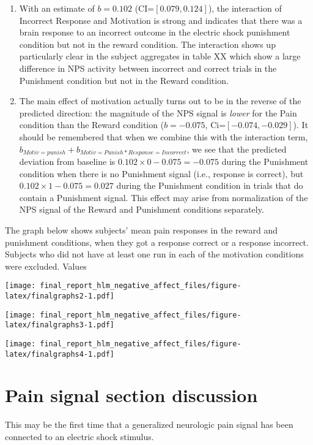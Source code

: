 \documentclass[]{article}
\providecommand{\tightlist}{%
  \setlength{\itemsep}{0pt}\setlength{\parskip}{0pt}}
\begin{document}
\begin{enumerate}
\def\labelenumi{\arabic{enumi}.}
\tightlist
\item
  With an estimate of \(b=0.102\) (CI=\([0.079,0.124]\)), the
  interaction of Incorrect Response and Motivation is strong and
  indicates that there was a brain response to an incorrect outcome in
  the electric shock punishment condition but not in the reward
  condition. The interaction shows up particularly clear in the subject
  aggregates in table XX which show a large difference in NPS activity
  between incorrect and correct trials in the Punishment condition but
  not in the Reward condition.
\item
  The main effect of motivation actually turns out to be in the reverse
  of the predicted direction: the magnitude of the NPS signal is
  \emph{lower} for the Pain condition than the Reward condition
  (\(b=-0.075\), Ci=\([-0.074, -0.029]\)). It should be remembered that
  when we combine this with the interaction term,
  \(b_{Motiv=punish} + b_{Motiv=Punish*Response=Incorrect}\), we see
  that the predicted deviation from baseline is
  \(0.102\times 0 - 0.075=-0.075\) during the Punishment condition when
  there is no Punishment signal (i.e., response is correct), but
  \(0.102\times 1 - 0.075=0.027\) during the Punishment condition in
  trials that do contain a Punishment signal. This effect may arise from
  normalization of the NPS signal of the Reward and Punishment
  conditions separately.
\end{enumerate}

The graph below shows subjects' mean pain responses in the reward and
punishment conditions, when they got a response correct or a response
incorrect. Subjects who did not have at least one run in each of the
motivation conditions were excluded. Values

\texttt{[image: final\_report\_hlm\_negative\_affect\_files/figure-latex/finalgraphs2-1.pdf]}

\texttt{[image: final\_report\_hlm\_negative\_affect\_files/figure-latex/finalgraphs3-1.pdf]}

\texttt{[image: final\_report\_hlm\_negative\_affect\_files/figure-latex/finalgraphs4-1.pdf]}

\section{Pain signal section
discussion}\label{pain-signal-section-discussion}

This may be the first time that a generalized neurologic pain signal has
been connected to an electric shock stimulus.
\end{document}
